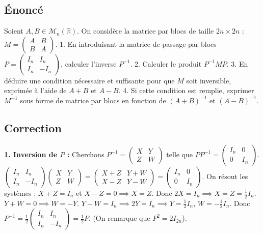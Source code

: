 \documentclass{report}
\begin{document}
\subsection*{Énoncé}
Soient $A, B \in \mathcal{M}_n(\mathbb{R})$.
On considère la matrice par blocs de taille $2n \times 2n$ : $M = \begin{pmatrix} A & B \\ B & A \end{pmatrix}$.
1. En introduisant la matrice de passage par blocs $P = \begin{pmatrix} I_n & I_n \\ I_n & -I_n \end{pmatrix}$, calculer l'inverse $P^{-1}$.
2. Calculer le produit $P^{-1} M P$.
3. En déduire une condition nécessaire et suffisante pour que $M$ soit inversible, exprimée à l'aide de $A+B$ et $A-B$.
4. Si cette condition est remplie, exprimer $M^{-1}$ sous forme de matrice par blocs en fonction de $(A+B)^{-1}$ et $(A-B)^{-1}$.

\subsection*{Correction}
\textbf{1. Inversion de $P$ :}
Cherchons $P^{-1} = \begin{pmatrix} X & Y \\ Z & W \end{pmatrix}$ telle que $P P^{-1} = \begin{pmatrix} I_n & 0 \\ 0 & I_n \end{pmatrix}$.
$\begin{pmatrix} I_n & I_n \\ I_n & -I_n \end{pmatrix} \begin{pmatrix} X & Y \\ Z & W \end{pmatrix} = \begin{pmatrix} X+Z & Y+W \\ X-Z & Y-W \end{pmatrix} = \begin{pmatrix} I_n & 0 \\ 0 & I_n \end{pmatrix}$.
On résout les systèmes :
$X+Z = I_n$ et $X-Z = 0 \implies X=Z$. Donc $2X = I_n \implies X = Z = \frac{1}{2}I_n$.
$Y+W = 0 \implies W = -Y$. $Y-W = I_n \implies 2Y = I_n \implies Y = \frac{1}{2}I_n$, $W = -\frac{1}{2}I_n$.
Donc $P^{-1} = \frac{1}{2} \begin{pmatrix} I_n & I_n \\ I_n & -I_n \end{pmatrix} = \frac{1}{2} P$.
(On remarque que $P^2 = 2 I_{2n}$).
\end{document}

